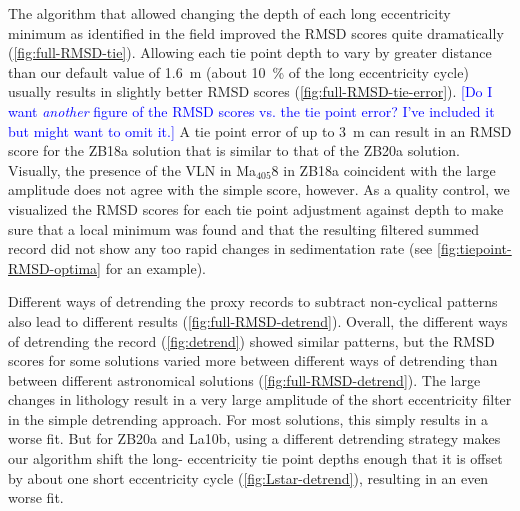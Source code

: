 \documentclass[draft]{agujournal2019}
\newcommand{\ma}[1]{Ma\(_{405}\)#1} %
\newcommand{\rez}{\textcolor{magenta}}
\newcommand{\ijk}{\textcolor{blue}}
\begin{document}
The algorithm that allowed changing the depth of each long eccentricity minimum as identified in the field improved the \gls{RMSD} scores quite dramatically (\cref{fig:full-RMSD-tie}).
Allowing each tie point depth to vary by greater distance than our default value of \qty{1.6}{\metre} (about \qty{10}{\percent} of the long eccentricity cycle) usually results in slightly better \gls{RMSD} scores (\cref{fig:full-RMSD-tie-error}).
\ijk{[Do I want \emph{another} figure of the RMSD scores vs. the tie point error? I've included it but might want to omit it.]}
A tie point error of up to \qty{3}{\metre} can result in an \gls{RMSD} score for the ZB18a solution that is similar to that of the ZB20a solution.
Visually, the presence of the \gls{VLN} in \ma{8} in ZB18a coincident with the large amplitude does not agree with the simple score, however.
As a quality control, we visualized the \gls{RMSD} scores for each tie point adjustment against depth to make sure that a local minimum was found and that the resulting filtered summed record did not show any too rapid changes in sedimentation rate (see \cref{fig:tiepoint-RMSD-optima} for an example).


Different ways of detrending the proxy records to subtract non-cyclical patterns also lead to different results (\cref{fig:full-RMSD-detrend}).
Overall, the different ways of detrending the record (\cref{fig:detrend}) showed similar patterns, but the \gls{RMSD} scores for some solutions varied more between different ways of detrending than between different astronomical solutions (\cref{fig:full-RMSD-detrend}).
The large changes in lithology result in a very large amplitude of the short eccentricity filter in the simple detrending approach.
For most solutions, this simply results in a worse fit.
But for ZB20a and La10b, using a different detrending strategy makes our algorithm shift the long- eccentricity tie point depths enough that it is offset by about one short eccentricity cycle (\cref{fig:Lstar-detrend}), resulting in an even worse fit.
\end{document}
